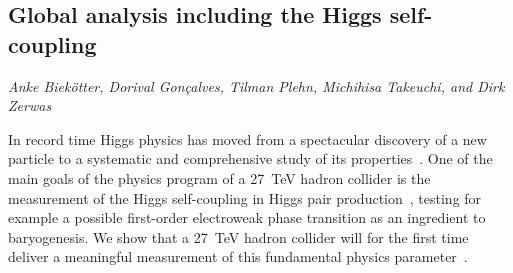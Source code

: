
\subsection{Global analysis including the Higgs self-coupling}

\begin{center}
\textit{Anke Biek\"otter, Dorival Gon\c{c}alves, Tilman Plehn, Michihisa Takeuchi, and Dirk Zerwas}
\end{center}



In record time Higgs physics has moved from a spectacular discovery of
a new particle to a systematic and comprehensive study of its
properties~\cite{Dawson:2018dcd}. 
One of the main goals of the physics program of a 27~TeV hadron 
collider 
is the measurement of the Higgs self-coupling in Higgs pair
production~\cite{Baur:2003gp,Kling:2016lay,Goncalves:2018yva,Homiller:2018dgu,Barger:2013jfa,Barr:2014sga},
testing for example a possible first-order electroweak
phase transition as an ingredient to
baryogenesis. 
We show that a 27~TeV hadron collider will for the first time 
deliver a meaningful measurement of this fundamental physics 
parameter~\cite{Biekotter:2018jzu}. \medskip

